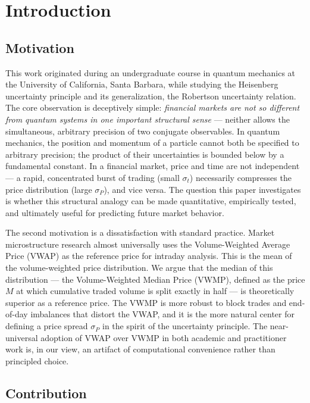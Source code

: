 \documentclass[preprint,12pt]{elsarticle}
\begin{document}
\section{Introduction}

\subsection{Motivation}

This work originated during an undergraduate course in quantum mechanics at the University of California, Santa Barbara, while studying the Heisenberg uncertainty principle and its generalization, the Robertson uncertainty relation. The core observation is deceptively simple: \textit{financial markets are not so different from quantum systems in one important structural sense} --- neither allows the simultaneous, arbitrary precision of two conjugate observables. In quantum mechanics, the position and momentum of a particle cannot both be specified to arbitrary precision; the product of their uncertainties is bounded below by a fundamental constant. In a financial market, price and time are not independent --- a rapid, concentrated burst of trading (small $\sigma_t$) necessarily compresses the price distribution (large $\sigma_P$), and vice versa. The question this paper investigates is whether this structural analogy can be made quantitative, empirically tested, and ultimately useful for predicting future market behavior.

The second motivation is a dissatisfaction with standard practice. Market microstructure research almost universally uses the Volume-Weighted Average Price (VWAP) as the reference price for intraday analysis. This is the mean of the volume-weighted price distribution. We argue that the median of this distribution --- the Volume-Weighted Median Price (VWMP), defined as the price $M$ at which cumulative traded volume is split exactly in half --- is theoretically superior as a reference price. The VWMP is more robust to block trades and end-of-day imbalances that distort the VWAP, and it is the more natural center for defining a price spread $\sigma_P$ in the spirit of the uncertainty principle. The near-universal adoption of VWAP over VWMP in both academic and practitioner work is, in our view, an artifact of computational convenience rather than principled choice.

\subsection{Contribution}
\end{document}
